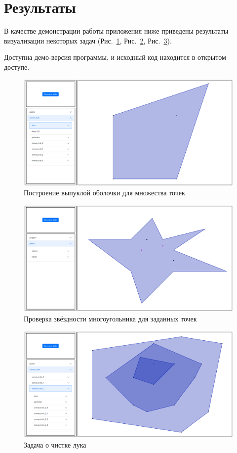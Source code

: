 \documentclass[12pt]{article}
\begin{document}
\section{Результаты}

В качестве демонстрации работы приложения ниже приведены результаты визуализации некоторых задач (Рис.~\ref{fig:1}, Рис.~\ref{fig:2}, Рис.~\ref{fig:3}).

Доступна демо-версия программы\cite{b2}, и исходный код находится в открытом доступе\cite{b3}. 

\begin{figure}[ht!]
	\centering
	\includegraphics[width=.8\linewidth]{3.png}
	\caption{Построение выпуклой оболочки для множества точек}
	\label{fig:1}
\end{figure}

\begin{figure}[ht!]
	\centering
	\includegraphics[width=.8\linewidth]{9.png}
	\caption{Проверка звёздности многоугольника для заданных точек}
	\label{fig:2}
\end{figure}

\begin{figure}[ht!]
	\centering
	\includegraphics[width=.8\linewidth]{16.png}
	\caption{Задача о чистке лука}
	\label{fig:3}
\end{figure}
\end{document}
